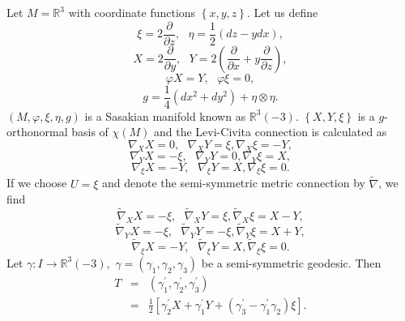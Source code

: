 \documentclass{amsart}
\theoremstyle{plain}
\theoremstyle{definition}
\theoremstyle{remark}
\numberwithin{equation}{section}
\begin{document}
Let $M=\mathbb{R}^{3}$ with coordinate functions $\left\{ x,y,z\right\} $.
Let us define%
\begin{equation*}
\xi =2\frac{\partial }{\partial z},\text{ }\eta =\frac{1}{2}\left(
dz-ydx\right) ,
\end{equation*}%
\begin{equation*}
X=2\frac{\partial }{\partial y},\text{ }Y=2\left( \frac{\partial }{\partial x%
}+y\frac{\partial }{\partial z}\right) ,
\end{equation*}%
\begin{equation*}
\varphi X=Y,\text{ }\varphi \xi =0,
\end{equation*}%
\begin{equation*}
g=\frac{1}{4}\left( dx^{2}+dy^{2}\right) +\eta \otimes \eta .
\end{equation*}%
$\left( M,\varphi ,\xi ,\eta ,g\right) $ is a Sasakian manifold known as $%
\mathbb{R}^{3}(-3)$. $\left\{ X,Y,\xi \right\} $ is a $g$-orthonormal basis
of $\chi \left( M\right) $ and the Levi-Civita connection is calculated as%
\begin{equation*}
\nabla _{X}X=0,\text{ }\nabla _{X}Y=\xi ,\nabla _{X}\xi =-Y,
\end{equation*}%
\begin{equation*}
\nabla _{Y}X=-\xi ,\text{ }\nabla _{Y}Y=0,\nabla _{Y}\xi =X,
\end{equation*}%
\begin{equation*}
\nabla _{\xi }X=-Y,\text{ }\nabla _{\xi }Y=X,\nabla _{\xi }\xi =0.
\end{equation*}%
If we choose $U=\xi $ and denote the semi-symmetric metric connection by $%
\widetilde{\nabla }$, we find%
\begin{equation*}
\widetilde{\nabla }_{X}X=-\xi ,\text{ }\widetilde{\nabla }_{X}Y=\xi ,%
\widetilde{\nabla }_{X}\xi =X-Y,
\end{equation*}%
\begin{equation*}
\widetilde{\nabla }_{Y}X=-\xi ,\text{ }\widetilde{\nabla }_{Y}Y=-\xi ,%
\widetilde{\nabla }_{Y}\xi =X+Y,
\end{equation*}%
\begin{equation*}
\widetilde{\nabla }_{\xi }X=-Y,\text{ }\widetilde{\nabla }_{\xi }Y=X,%
\widetilde{\nabla }_{\xi }\xi =0.
\end{equation*}%
Let $\gamma :I\rightarrow \mathbb{R}^{3}(-3),$ $\gamma =\left( \gamma
_{1},\gamma _{2},\gamma _{3}\right) $ be a semi-symmetric geodesic. Then%
\begin{eqnarray*}
T &=&\left( \gamma _{1}^{\prime },\gamma _{2}^{\prime },\gamma _{3}^{\prime
}\right) \\
&=&\frac{1}{2}\left[ \gamma _{2}^{\prime }X+\gamma _{1}^{\prime }Y+\left(
\gamma _{3}^{\prime }-\gamma _{1}^{\prime }\gamma _{2}\right) \xi \right] .
\end{eqnarray*}%
\end{document}

